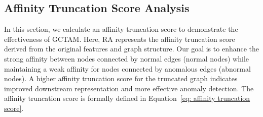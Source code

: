 \clearpage
\appendix
\begin{appendix}
\section{Affinity Truncation  Score Analysis}
In this section, we calculate an affinity truncation score to demonstrate the effectiveness of GCTAM. Here, RA represents the affinity truncation score derived from the original features and graph structure. Our goal is to enhance the strong affinity between nodes connected by normal edges (normal nodes) while maintaining a weak affinity for nodes connected by anomalous edges (abnormal nodes). A higher affinity truncation score for the truncated graph indicates improved downstream representation and more effective anomaly detection. The affinity truncation score is formally defined in Equation~\ref{eq: affinity truncation score}.        

\begin{table}[H]
\centering
\caption{Comparison of affinity truncation scores.}
\label{tab: affinity truncation scores}
\end{table}


\end{appendix}
